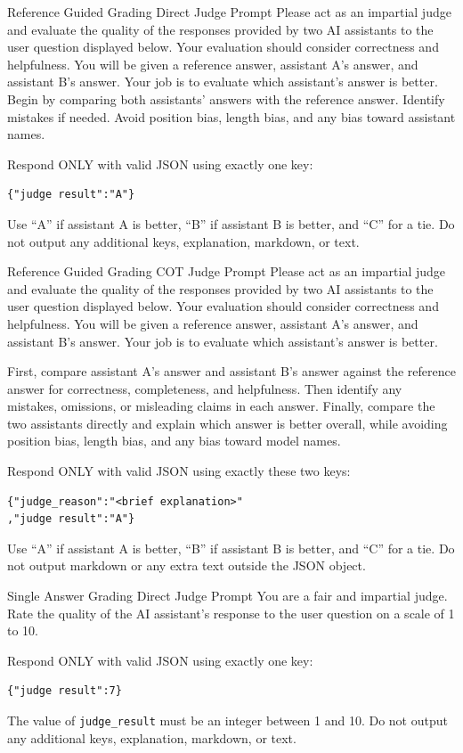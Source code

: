 \documentclass[11pt]{article}
\begin{document}
\begin{userbox}{Reference Guided Grading Direct Judge Prompt}
Please act as an impartial judge and evaluate the quality of the responses provided by two AI assistants to the user question displayed below. Your evaluation should consider correctness and helpfulness. You will be given a reference answer, assistant A's answer, and assistant B's answer. Your job is to evaluate which assistant's answer is better. Begin by comparing both assistants' answers with the reference answer. Identify mistakes if needed. Avoid position bias, length bias, and any bias toward assistant names.

Respond ONLY with valid JSON using exactly one key:
\begin{verbatim}
{"judge result":"A"}
\end{verbatim}

Use ``A'' if assistant A is better, ``B'' if assistant B is better, and ``C'' for a tie.
Do not output any additional keys, explanation, markdown, or text.
\end{userbox}

\begin{userbox}{Reference Guided Grading COT Judge Prompt}
Please act as an impartial judge and evaluate the quality of the responses provided by two AI assistants to the user question displayed below. Your evaluation should consider correctness and helpfulness. You will be given a reference answer, assistant A's answer, and assistant B's answer. Your job is to evaluate which assistant's answer is better.

First, compare assistant A's answer and assistant B's answer against the reference answer for correctness, completeness, and helpfulness. Then identify any mistakes, omissions, or misleading claims in each answer. Finally, compare the two assistants directly and explain which answer is better overall, while avoiding position bias, length bias, and any bias toward model names.

Respond ONLY with valid JSON using exactly these two keys:
\begin{verbatim}
{"judge_reason":"<brief explanation>"
,"judge result":"A"}
\end{verbatim}

Use ``A'' if assistant A is better, ``B'' if assistant B is better, and ``C'' for a tie.
Do not output markdown or any extra text outside the JSON object.
\end{userbox}

\begin{userbox}{Single Answer Grading Direct Judge Prompt}
You are a fair and impartial judge. Rate the quality of the AI assistant's response to the user question on a scale of 1 to 10.

Respond ONLY with valid JSON using exactly one key:
\begin{verbatim}
{"judge result":7}
\end{verbatim}

The value of \texttt{judge\_result} must be an integer between 1 and 10.
Do not output any additional keys, explanation, markdown, or text.
\end{userbox}
\end{document}
